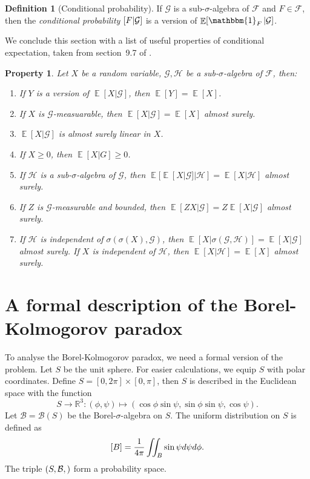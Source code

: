\documentclass[twoside,a4paper]{report}
\theoremstyle{plain}
\newtheorem{property}[theorem]{Property}
\theoremstyle{definition}
\newtheorem{definition}[theorem]{Definition}
\theoremstyle{remark}
\numberwithin{equation}{chapter}
\newcommand{\R}{\mathbb{R}}
\let\P\relax
\DeclareMathOperator{\P}{\mathbb{P}}
\DeclareMathOperator{\E}{\mathbb{E}}
\DeclareMathOperator{\1}{\mathbbm{1}}
\newcommand{\F}{\mathcal{F}}
\renewcommand{\G}{\mathcal{G}}
\renewcommand{\H}{\mathcal{H}}
\newcommand{\B}{\mathcal{B}}
\begin{document}
\begin{definition}[Conditional probability]
If $\G$ is a sub-$\sigma$-algebra of $\F$ and $F\in\F$, then the \emph{conditional probability} $\P[F|\G]$ is a version of $\E[\1_F|\G]$.
\end{definition}

We conclude this section with a list of useful properties of conditional expectation, taken from section~9.7 of \cite{Williams91}.

\begin{property}\label{property:expcon}
Let $X$ be a random variable, $\G,\H$ be a sub-$\sigma$-algebra of $\F$, then:
\begin{enumerate}
\item If $Y$ is a version of $\E[X|\G]$, then $\E[Y]=\E[X]$.
\item If $X$ is $\G$-measuarable, then $\E[X|\G]=\E[X]$ almost surely.
\item $\E[X|\G]$ is almost surely linear in $X$.
\item If $X\geq 0$, then $\E[X|G]\geq 0$.
\item If $\H$ is a sub-$\sigma$-algebra of $\G$, then $\E[\E[X|\G]|\H]=\E[X|\H]$ almost surely.
\item If $Z$ is $\G$-measurable and bounded, then $\E[ZX|\G]=Z\E[X|\G]$ almost surely.
\item If $\H$ is independent of $\sigma(\sigma(X),\G)$, then $\E[X|\sigma(\G,\H)]=\E[X|\G]$ almost surely. If $X$ is independent of $\H$, then $\E[X|\H]=\E[X]$ almost surely.
\end{enumerate}
\end{property}

\section{A formal description of the Borel-Kolmogorov paradox}
To analyse the Borel-Kolmogorov paradox, we need a formal version of the problem. Let $S$ be the unit sphere. For easier calculations, we equip $S$ with polar coordinates. Define $S=[0,2\pi]\times[0,\pi]$, then $S$ is described in the Euclidean space with the function
\begin{equation}\label{eq:BorelPolar}
S\to\R^3:(\phi,\psi)\mapsto(\cos\phi\sin\psi,\sin\phi\sin\psi,\cos\psi).
\end{equation}
Let $\B=\B(S)$ be the Borel-$\sigma$-algebra on $S$. The uniform distribution on $S$ is defined as
\begin{equation}
\P[B]=\frac{1}{4\pi}\iint_B\sin\psi d\psi d\phi.
\end{equation}
The triple $(S,\B,\P)$ form a probability space.
\end{document}

